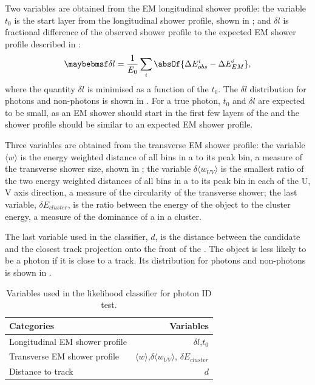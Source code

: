 Two variables are obtained from the EM longitudinal shower profile: the variable $t_0$ is the start layer from the longitudinal shower profile, shown in ; and $\delta{l}$ is fractional difference of the observed shower profile to the expected EM shower profile described in :
\begin{equation}
\delta l = \frac{1}{E_0}\sum_{i}^{}\absOf{\Delta E_{obs}^i - \Delta E_{EM}^i },
\end{equation}
where the quantity $\delta l$ is minimised as a function of the $t_0$. The $\delta l$ distribution for photons and non-photons is shown in . For a true photon, $t_0$  and $\delta l $ are expected to be small, as an EM shower should start in the first few layers of the \ECAL and the shower profile should be similar to an expected EM shower profile.

Three variables are obtained from the transverse EM shower profile: the variable $\langle{w}\rangle$ is the energy weighted \rms distance of all bins in a \ShowerPeak to its peak bin, a measure of the transverse shower size, shown in ; the variable $\delta{\langle{w_{UV}}\rangle}$ is the smallest ratio of the two energy weighted \rms distances of all bins in a \ShowerPeak to its peak bin in each of the U, V axis direction, a measure of the circularity of the transverse shower; the last variable, $\delta E_{cluster}$, is the  ratio between the energy of the \ShowerPeak object to the cluster energy, a measure of the dominance of a \ShowerPeak in a cluster.

The last variable used in the classifier, $d$, is the distance between the candidate and the closest track projection onto the front of the \ECAL. The \ShowerPeak object is less likely to be a photon if it is close to a track. Its distribution for photons and non-photons is shown in .


\begin{table}[htbp] \centering \smallskip
\begin{tabular}{l r }
\hline
\hline
Categories&  Variables\\
\hline
Longitudinal EM shower profile & $\delta{l}$,$t_0$ \\
Transverse EM shower profile & $\langle{w}\rangle$,$\delta{\langle{w_{UV}}\rangle}$, $\delta E_{cluster}$ \\
Distance to track &  $d$ \\
\hline
\hline
\end{tabular}
\caption
{Variables used in the likelihood classifier for photon ID test.}
\label{tab:photonPhotonIDvar}
\end{table}

